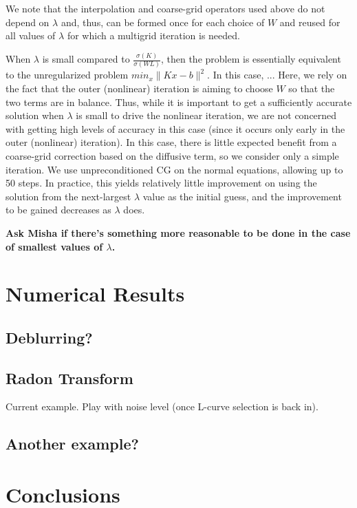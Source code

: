 \documentclass{article}
\begin{document}
We note that the interpolation and coarse-grid operators used above do
not depend on $\lambda$ and, thus, can be formed once for each choice
of $W$ and reused for all values of $\lambda$ for which a multigrid
iteration is needed.

When $\lambda$ is small compared to $\frac{\sigma(K)}{\sigma(WL)}$,
then the problem is essentially equivalent to the unregularized
problem $min_x \|Kx-b\|^2$.  In this case, ... Here, we rely on the
fact that the outer (nonlinear) iteration is aiming to choose $W$ so
that the two terms are in balance.  Thus, while it is important to get
a sufficiently accurate solution when $\lambda$ is small to drive the
nonlinear iteration, we are not concerned with getting high levels of
accuracy in this case (since it occurs only early in the outer
(nonlinear) iteration).  In this case, there is little expected
benefit from a coarse-grid correction based on the diffusive term, so
we consider only a simple iteration.  We use unpreconditioned CG on
the normal equations, allowing up to 50 steps.  In practice, this
yields relatively little improvement on using the solution from the
next-largest $\lambda$ value as the initial guess, and the improvement
to be gained decreases as $\lambda$ does.

{\bf Ask Misha if there's something more reasonable to be done in the
  case of smallest values of $\lambda$.}


\section{Numerical Results}

\subsection{Deblurring?}

\subsection{Radon Transform}

Current example.  Play with noise level (once L-curve selection is
back in).

\subsection{Another example?}

\section{Conclusions}
\end{document}

